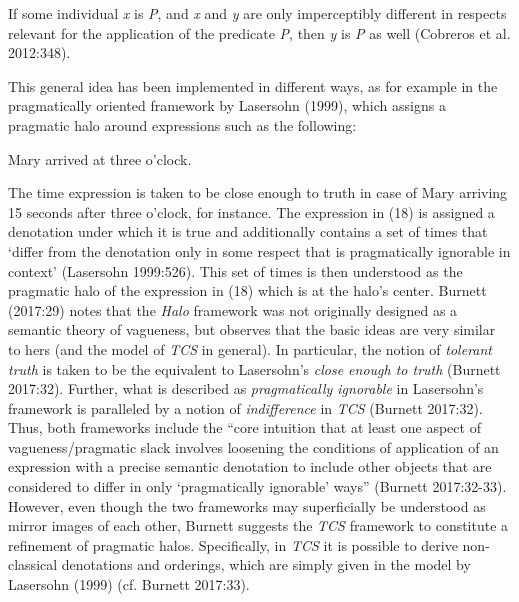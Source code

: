 \documentclass[output=paper
,modfonts
,nonflat]{langsci/langscibook}
\begin{document}
\begin{examples}
	\item If some individual \textit{x} is \textit{P}, and \textit{x} and \textit{y} are only imperceptibly different in respects relevant for the application of the predicate \textit{P}, then \textit{y} is \textit{P} as well (Cobreros et al. 2012:348).
\end{examples}

This general idea has been implemented in different ways, as for example in the pragmatically oriented framework by Lasersohn (1999), which assigns a pragmatic halo around expressions such as the following:

\begin{examples}
	\item Mary arrived at three o'clock.
\end{examples}

The time expression is taken to be close enough to truth in case of Mary arriving 15 seconds after three o'clock, for instance. The expression in (18) is assigned a denotation under which it is true and additionally contains a set of times that `differ from the denotation only in some respect that is pragmatically ignorable in context' (Lasersohn 1999:526). This set of times is then understood as the pragmatic halo of the expression in (18) which is at the halo's center. Burnett (2017:29) notes that the \textit{Halo} framework was not originally designed as a semantic theory of vagueness, but observes that the basic ideas are very similar to hers (and the model of \textit{TCS} in general). In particular, the notion of \textit{tolerant truth} is taken to be the equivalent to Lasersohn's \textit{close enough to truth} (Burnett 2017:32). Further, what is described as \textit{pragmatically ignorable} in Lasersohn's framework is paralleled by a notion of \textit{indifference} in \textit{TCS} (Burnett 2017:32). Thus, both frameworks include the ``core intuition that at least one aspect of vagueness/pragmatic slack involves loosening the conditions of application of an expression with a precise semantic denotation to include other objects that are considered to differ in only `pragmatically ignorable' ways'' (Burnett 2017:32-33). However, even though the two frameworks may superficially be understood as mirror images of each other, Burnett suggests the \textit{TCS} framework to constitute a refinement of pragmatic halos. Specifically, in \textit{TCS} it is possible to derive non-classical denotations and orderings, which are simply given in the model by Lasersohn (1999) (cf. Burnett 2017:33).
\end{document}

